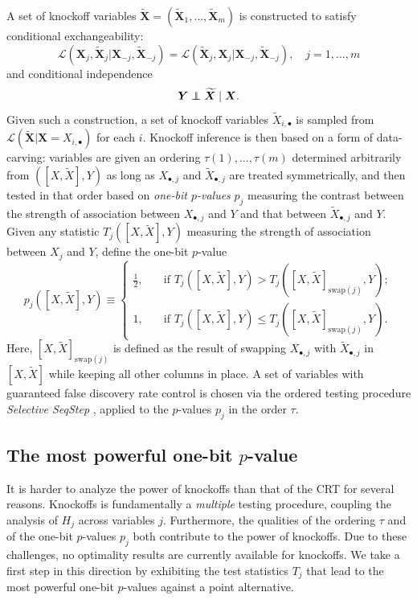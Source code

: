 \documentclass[12pt]{article}
\theoremstyle{definition}
\theoremstyle{remark}
\def\independenT#1#2{\mathrel{\rlap{$#1#2$}\mkern2mu{#1#2}}}
\newcommand\independent{\protect\mathpalette{\protect\independenT}{\perp}}
\newcommand{\prx}{\bm X}
\newcommand{\srx}{X}
\newcommand{\prxk}{{{\widetilde{\bm X}}}}
\newcommand{\srxk}{\widetilde X}
\newcommand{\pry}{{\bm Y}}
\newcommand{\sry}{Y}
\begin{document}
A set of knockoff variables $\prxk = (\prxk_1, \dots, \prxk_m)$ is constructed to satisfy conditional exchangeability:
\begin{equation}
\mathcal L(\prx_j, \prxk_j | \prx_{-j}, \prxk_{-j}) = \mathcal L(\prxk_j, \prx_j | \prx_{-j}, \prxk_{-j}), \quad j = 1, \dots, m
\label{conditional-exchangeability}
\end{equation}
and conditional independence 
\begin{equation}
\pry \independent \prxk \mid \prx.
\label{knockoff-conditional-independence}
\end{equation}
Given such a construction, a set of knockoff variables $\srxk_{i,\bullet}$ is sampled from  $\mathcal L(\prxk|\prx = \srx_{i,\bullet})$ for each $i$. Knockoff inference is then based on a form of data-carving: variables are given an ordering $\tau(1), \dots, \tau(m)$ determined arbitrarily from $([\srx, \srxk], \sry)$ as long as $\srx_{\bullet, j}$ and $\srxk_{\bullet, j}$ are treated symmetrically, and then tested in that order based on \textit{one-bit $p$-values} $p_j$ measuring the contrast between the strength of association between $\srx_{\bullet, j}$ and $\sry$ and that between $\srxk_{\bullet, j}$ and $\sry$. Given any statistic $T_j([\srx, \srxk], \sry)$ measuring the strength of association between $\srx_j$ and $\sry$, define the one-bit $p$-value
\begin{equation}
p_j([\srx, \srxk], \sry) \equiv 
\begin{cases}
\frac12, \quad &\text{if } T_j([\srx, \srxk], \sry) > T_j([\srx, \srxk]_{\text{swap}(j)}, \sry);  \\
1, \quad &\text{if } T_j([\srx, \srxk], \sry) \leq T_j([\srx, \srxk]_{\text{swap}(j)}, \sry).
\end{cases}
\label{one-bit-pvalue}
\end{equation}
Here, $[\srx, \srxk]_{\text{swap}(j)}$ is defined as the result of swapping $\srx_{\bullet, j}$ with $\srxk_{\bullet, j}$ in $[\srx, \srxk]$ while keeping all other columns in place. A set of variables with guaranteed false discovery rate control is chosen via the ordered testing procedure \textit{Selective SeqStep} \cite{BC15}, applied to the $p$-values $p_j$ in the order $\tau$.


\subsection{The most powerful one-bit $p$-value}

It is harder to analyze the power of knockoffs than that of the CRT for several reasons. Knockoffs is fundamentally a \textit{multiple} testing procedure, coupling the analysis of $H_j$ across variables $j$. Furthermore, the qualities of the ordering $\tau$ and of the one-bit $p$-values $p_j$ both contribute to the power of knockoffs. Due to these challenges, no optimality results are currently available for knockoffs. We take a first step in this direction by exhibiting the test statistics $T_j$ that lead to the most powerful one-bit $p$-values against a point alternative. 
\end{document}
